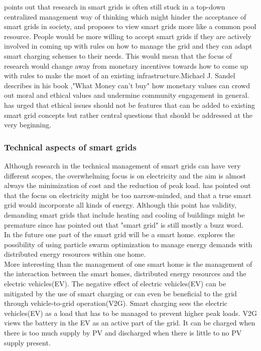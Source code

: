 \documentclass[a4paper]{article}
\begin{document}
\cite{smartcpr} points out that research in smart grids is often still stuck in a top-down centralized management way of thinking which 
might hinder the acceptance of smart grids in society, and proposes to view smart grids more like a common pool resource. People would
be more willing to accept smart grids if 
they are actively involved in coming up with rules on how to manage the grid and they can adapt smart charging schemes  to their needs. 
This would mean that the focus of research would change away from monetary incentives towards how to come up with rules to make the 
most of an existing infrastructure.Michael J. Sandel describes in his book ,"What Money can't buy" how monetary values can crowd out 
moral and ethical values and undermine community engagement in general. \cite{ethics2} has urged that ethical issues should not
be features that can be added to existing smart grid concepts but rather central questions that should be addressed at the very beginning.
 \\
 \subsubsection{Technical aspects of smart grids}
Although research in the technical management of smart grids can have very different scopes, the overwhelming focus is on electricity
and the aim is almost always the minimization of cost 
and the reduction of peak load. \cite{smartenergy} has pointed out that the focus on electricity might be too narrow-minded, and that
a true smart grid would incorporate all kinds 
of energy. Although this point has validity, demanding smart grids that include heating and cooling of buildings might be premature 
since \cite{smartcpr} has pointed 
out that "smart grid" is still mostly a buzz word. \\
In the future one part of the smart grid will be a smart home. \cite{smarthome} explores the possibility of using particle swarm 
optimization to manage energy demands with 
distributed energy resources within one home.\\
More interesting than the management of one smart home is the management of the interaction between the smart homes, distributed 
energy resources and the electric vehicles(EV). 
The negative effect of electric vehicles(EV) can be mitigated by the use of smart charging or can even be beneficial to the grid 
through vehicle-to-grid operation(V2G). Smart charging sees 
the electric vehicles(EV) as a load that has to be managed to prevent higher peak loads. V2G views the battery in the EV as an active 
part of the grid. It can be charged when there 
is too much supply by PV and discharged when there is little to no PV supply present\cite{v2g}.\\
\end{document}
